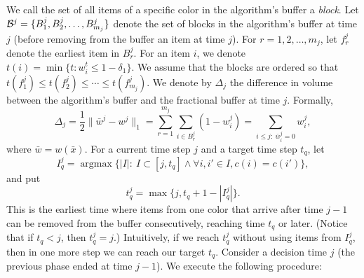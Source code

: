 \documentclass[11pt]{article}
\DeclareMathOperator{\argmax}{argmax}
\begin{document}
We call the set of all items of a specific color in the algorithm's
buffer a {\em block}. Let ${\cal B}^j = \{B^j_1,B^j_2,\dots,B^j_{m_j}\}$
denote the set of blocks in the algorithm's buffer at time $j$ (before
removing from the buffer an item at time $j$). For $r=1,2,\dots,m_j$,
let $f^j_r$ denote the earliest item in $B^j_r$.
For an item $i$, we denote $t(i) = \min\{t: w_i^t\le 1 - \delta_1\}$.
We assume that the
blocks are ordered so that $t(f^j_1)\le t(f^j_2)\le \cdots\le t(f^j_{m_j})$.
We denote by $\Delta_j$ the difference in volume between
the algorithm's buffer and the fractional buffer at time $j$.
Formally,
$$
\Delta_j = \frac 1 2 \|\bar{w}^j - w^j\|_1 =
\sum_{r=1}^{m_j}\sum_{i\in B^j_r} (1 - w^j_i) =
\sum_{i \le j:\ \bar{w}^j_i = 0} w^j_i,
$$
where $\bar{w} = w(\bar{x})$.
For a current time step $j$ and a target time step $t_q$, let
$$
I^j_q = \argmax\{|I|:\ I\subset [j,t_q]\wedge \forall i,i'\in I, c(i) = c(i')\},
$$
and put
$$
t^j_q = \max\{j, t_q + 1 - |I^j_q|\}.
$$
This is the earliest time where items from one color that arrive after
time $j-1$ can be removed from the buffer consecutively,
reaching time $t_q$ or later. (Notice that if $t_q < j$, then $t^j_q = j$.)
Intuitively, if we reach $t^j_q$ without using items from $I^j_q$,
then in one more step we can reach our target $t_q$.
Consider a decision time $j$ (the previous phase ended at time $j-1$).
We execute the following procedure:
\end{document}
